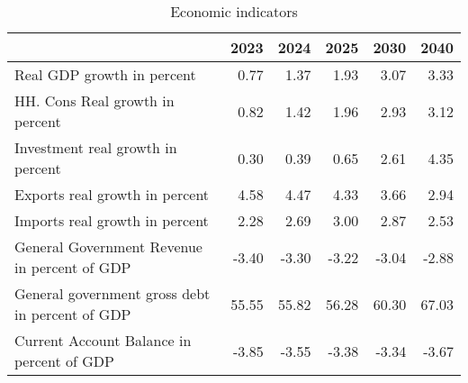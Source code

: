 \documentclass{article}
\begin{document}
\begin{table}
\caption{Economic indicators}
\begin{tabular}{lrrrrr}
\hline
 & 2023 & 2024 & 2025 & 2030 & 2040 \\
\hline
Real GDP growth in percent & 0.77  & 1.37  & 1.93  & 3.07  & 3.33  \\
HH. Cons Real growth in percent & 0.82  & 1.42  & 1.96  & 2.93  & 3.12  \\
Investment real growth in percent & 0.30  & 0.39  & 0.65  & 2.61  & 4.35  \\
Exports real growth in percent & 4.58  & 4.47  & 4.33  & 3.66  & 2.94  \\
Imports real growth in percent & 2.28  & 2.69  & 3.00  & 2.87  & 2.53  \\
General Government Revenue in percent of GDP & -3.40  & -3.30  & -3.22  & -3.04  & -2.88  \\
General government gross debt  in percent of GDP & 55.55  & 55.82  & 56.28  & 60.30  & 67.03  \\
Current Account Balance in percent of GDP & -3.85  & -3.55  & -3.38  & -3.34  & -3.67  \\
\hline
\end{tabular}
\end{table}
\end{document}
